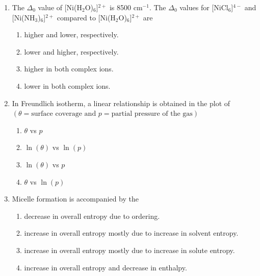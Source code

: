 \documentclass[journal,12pt,onecolumn]{IEEEtran}
\theoremstyle{remark}
\begin{document}
\begin{enumerate}
\item The $\Delta_0$ value of [Ni(H$_2$O)$_6$]$^{2+}$ is 8500 cm$^{-1}$. The $\Delta_0$ values for [NiCl$_6$]$^{4-}$ and [Ni(NH$_3$)$_6$]$^{2+}$ compared to [Ni(H$_2$O)$_6$]$^{2+}$ are \hfill{}
\begin{multicols}{2}
\begin{enumerate}
    \item higher and lower, respectively.
    \item lower and higher, respectively.
    \item higher in both complex ions.
    \item lower in both complex ions.
\end{enumerate}
\end{multicols}






\item In Freundlich isotherm, a linear relationship is obtained in the plot of \\
$(\theta = \text{surface coverage and } p = \text{partial pressure of the gas})$ \hfill{}
\begin{multicols}{4}
\begin{enumerate}
    \item $\theta$ vs $p$
    \item $\ln(\theta)$ vs $\ln(p)$
    \item $\ln(\theta)$ vs $p$
    \item $\theta$ vs $\ln(p)$
\end{enumerate}
\end{multicols}

\item Micelle formation is accompanied by the \hfill{}

\begin{enumerate}
    \item decrease in overall entropy due to ordering.
    \item increase in overall entropy mostly due to increase in solvent entropy.
    \item increase in overall entropy mostly due to increase in solute entropy.
    \item increase in overall entropy and decrease in enthalpy.
\end{enumerate}


\end{enumerate}
\end{document}
